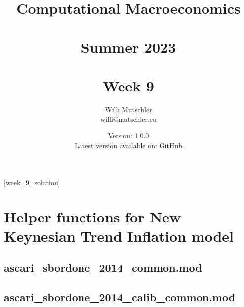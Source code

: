
\newif\ifDisplaySolutions%


\title{Computational Macroeconomics\\~\\Summer 2023\\~\\Week 9}
\author{Willi Mutschler\\willi@mutschler.eu}
\date{Version: 1.0.0\\Latest version available on: \href{https://github.com/wmutschl/Computational-Macroeconomics/releases/latest/download/week_9.pdf}{GitHub}}
\maketitle\thispagestyle{empty}

\newpage
{}[week_9_solution]
\tableofcontents\thispagestyle{empty}\newpage

\setcounter{page}{1}
\newpage
\newpage

\printbibliography

\newpage

\appendix

\section{Helper functions for New Keynesian Trend Inflation model}

\subsection{ascari\_sbordone\_2014\_common.mod\label{app:ascari_sbordone_2014_common}}


\subsection{ascari\_sbordone\_2014\_calib\_common.mod\label{app:ascari_sbordone_2014_calib_common}}



